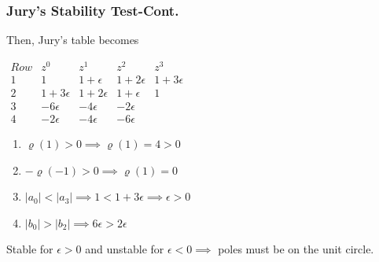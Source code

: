 \documentclass[mathserif, 10pt]{beamer} %
\begin{document}
\frame
{
\normalsize

\frametitle{Jury's Stability Test-Cont. }

Then, Jury's table becomes \\ \vspace{.05in}

$\begin{array}{ccccc}
	Row&z^0&z^1&z^2&z^3\\
	1&1&1+\epsilon&1+2\epsilon&1+3\epsilon\\
	2&1+3\epsilon&1+2\epsilon&1+\epsilon&1\\
	3&-6\epsilon&-4\epsilon&-2\epsilon\\
	4&-2\epsilon&-4\epsilon&-6\epsilon
\end{array}$\\

\begin{enumerate}
	\item $\varrho(1)>0 \implies \varrho(1) = 4>0$
	\item $-\varrho(-1)>0 \implies \varrho(1) = 0$
	\item $|a_0|<|a_3| \implies 1<1+3\epsilon \implies \epsilon>0$
	\item $|b_0|>|b_2| \implies 6\epsilon>2\epsilon$
\end{enumerate}

Stable for $\epsilon>0$ and unstable for $\epsilon<0 \implies $ poles must be on the unit circle.

}
\end{document}
